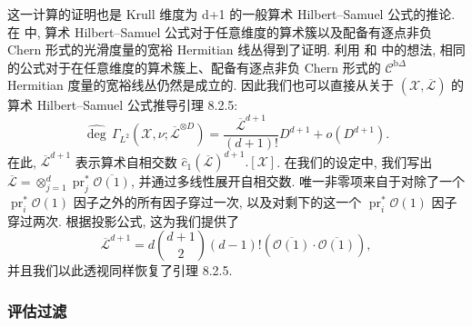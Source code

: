 \begin{remark}\label{rem:8.2.7}
这一计算的证明也是 Krull 维度为 d+1 的一般算术 Hilbert--Samuel 公式的推论. 
在 \cite[定理 1.4]{Zha95} 中, 算术 Hilbert--Samuel 公式对于任意维度的算术簇以及配备有逐点非负 Chern 形式的光滑度量的宽裕 Hermitian 线丛得到了证明. 
利用 \cite[第 5 节]{Bos99} 和 \cite[第 3--4 节]{BC22} 中的想法, 
相同的公式对于在任意维度的算术簇上、配备有逐点非负 Chern 形式的 \(\mathcal{C}^{\mathrm{b}\Delta}\) Hermitian 度量的宽裕线丛仍然是成立的. 
因此我们也可以直接从关于 \((\mathcal{X}, \overline{\mathcal{L}})\) 的算术 Hilbert--Samuel 公式推导引理 8.2.5:
\[ \widehat{\operatorname{deg}}\,\Gamma_{L^2}\left(\mathcal{X},\nu;\overline{\mathcal{L}}^{\otimes D}\right) = \frac{\overline{\mathcal{L}}^{d+1}}{(d+1)!}D^{d+1} + o(D^{d+1}). \]
在此, \(\overline{\mathcal{L}}^{d+1}\) 表示算术自相交数 \(\widehat{c}_1(\overline{\mathcal{L}})^{d+1}.[\mathcal{X}]\). 
在我们的设定中, 我们写出 \(\overline{\mathcal{L}} = \otimes_{j=1}^d \operatorname{pr}_j^* \overline{\mathcal{O}(1)}\), 
并通过多线性展开自相交数. 唯一非零项来自于对除了一个 \(\operatorname{pr}_{i}^{*}\mathcal{O}(1)\) 因子之外的所有因子穿过一次, 
以及对剩下的这一个 \(\operatorname{pr}_{i}^{*}\mathcal{O}(1)\) 因子穿过两次. 
根据投影公式, 这为我们提供了
\[ \overline{\mathcal{L}}^{d+1} = d \binom{d+1}{2} (d-1)! \left( \overline{\mathcal{O}(1)} \cdot \overline{\mathcal{O}(1)} \right), \]
并且我们以此透视同样恢复了引理 8.2.5. \end{remark}

\subsubsection{评估过滤}\label{sec:8.2.8}

